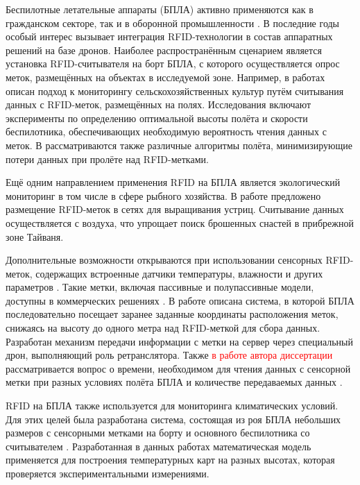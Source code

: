 \documentclass[12pt]{article}
\theoremstyle{definition}
\begin{document}
Беспилотные летательные аппараты (БПЛА) активно применяются как в гражданском секторе, так и в оборонной промышленности \cite{Choi2023, Mohsan2023, Gope2021}. В последние годы особый интерес вызывает интеграция RFID-технологии в состав аппаратных решений на базе дронов. Наиболее распространённым сценарием является установка RFID-считывателя на борт БПЛА, с которого осуществляется опрос меток, размещённых на объектах в исследуемой зоне. Например, в работах \cite{Quino2021,Quino2022} описан подход к мониторингу сельскохозяйственных культур путём считывания данных с RFID-меток, размещённых на полях. Исследования включают эксперименты по определению оптимальной высоты полёта и скорости беспилотника, обеспечивающих необходимую вероятность чтения данных с меток. В \cite{Quino2022} рассматриваются также различные алгоритмы полёта, минимизирующие потери данных при пролёте над RFID-метками.

Ещё одним направлением применения RFID на БПЛА является экологический мониторинг \cite{LeBreton2024} в том числе в сфере рыбного хозяйства. В работе \cite{Yang2017} предложено размещение RFID-меток в сетях для выращивания устриц. Считывание данных осуществляется с воздуха, что упрощает поиск брошенных снастей в прибрежной зоне Тайваня.

Дополнительные возможности открываются при использовании сенсорных RFID-меток, содержащих встроенные датчики температуры, влажности и других параметров \cite{Gortschacher2019, Kudyba2025, Mulloni2024}. Такие метки, включая пассивные и полупассивные модели, доступны в коммерческих решениях \cite{atlasrfidstore_site, dipolerfid_site}. В работе \cite{Wang2015} описана система, в которой БПЛА последовательно посещает заранее заданные координаты расположения меток, снижаясь на высоту до одного метра над RFID-меткой для сбора данных. Разработан механизм передачи информации с метки на сервер через специальный дрон, выполняющий роль ретранслятора. Также \textcolor{red}{в работе автора диссертации} рассматривается вопрос о времени, необходимом для чтения данных с сенсорной метки при разных условиях полёта БПЛА и количестве передаваемых данных \cite{Abramian2024, Abramian2025}.

RFID на БПЛА также используется для мониторинга климатических условий. Для этих целей была разработана система, состоящая из роя БПЛА небольших размеров с сенсорными метками на борту и основного беспилотника со считывателем \cite{Longhi2016, Longhi2017, Longhi2017a}. Разработанная в данных работах математическая модель применяется для построения температурных карт на разных высотах, которая проверяется экспериментальными измерениями.
\end{document}
